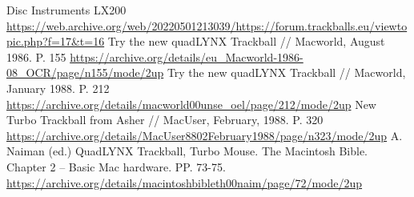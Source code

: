 \documentclass[11pt, a4paper]{article}
\begin{document}
\begin{thebibliography}{9}
 Disc Instruments LX200 \url{https://web.archive.org/web/20220501213039/https://forum.trackballs.eu/viewtopic.php?f=17&t=16}
 Try the new quadLYNX Trackball // Macworld, August 1986. P. 155  \url{https://archive.org/details/eu_Macworld-1986-08_OCR/page/n155/mode/2up}
 Try the new quadLYNX Trackball // Macworld, January 1988. P. 212 \url{https://archive.org/details/macworld00unse_oel/page/212/mode/2up}
 New Turbo Trackball from Asher // MacUser, February, 1988. P. 320 
\url{https://archive.org/details/MacUser8802February1988/page/n323/mode/2up}
 A. Naiman (ed.) QuadLYNX Trackball, Turbo Mouse. The Macintosh Bible. Chapter 2 -- Basic Mac hardware. PP. 73-75. \url{https://archive.org/details/macintoshbibleth00naim/page/72/mode/2up}
\end{thebibliography}
\end{document}
